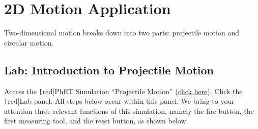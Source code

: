 \documentclass[main-physics.tex]{subfiles}
\begin{document}
\section{2D Motion Application}

Two-dimensional motion breaks down into two parts: projectile motion and circular motion.

\subsection{Lab: Introduction to Projectile Motion}

Access the \texttt[red]{PhET Simulation} ``Projectile Motion'' (\href{https://phet.colorado.edu/sims/html/projectile-motion/latest/projectile-motion_all.html}{click here}). Click the \texttt[red]{Lab} panel. All steps below occur within this panel. We bring to your attention three relevant functions of this simulation, namely the fire button, the first measuring tool, and the reset button, as shown below.

\begin{center}
    \hspace{5mm}
    \hspace{5mm}
\end{center}
\end{document}
